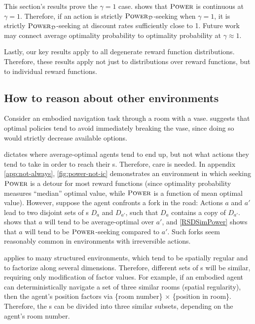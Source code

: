 This section's results prove the $\gamma=1$ case.  shows that $\text{\upshape\textsc{Power}}$ is continuous at  $\gamma=1$. Therefore, if an action is strictly $\text{\upshape\textsc{Power}}_{\mathcal{D}}$-seeking when $\gamma=1$, it is strictly $\text{\upshape\textsc{Power}}_{\mathcal{D}}$-seeking at discount rates sufficiently close to 1. Future work may connect average optimality probability to optimality probability at $\gamma\approx 1$. 

Lastly, our key results apply to all degenerate reward function distributions. Therefore, these results apply not just to distributions over reward functions, but to  individual reward functions.

\subsection{How to reason about other environments}
Consider an embodied navigation task through a room with a vase.  suggests that optimal policies tend to avoid immediately breaking the vase, since doing so would strictly decrease available options.

 dictates where average-optimal agents tend to end up, but not what actions they tend to take in order to reach their {\rsd}s. Therefore, care is needed. In appendix \ref{app:not-always}, \cref{fig:power-not-ic} demonstrates an environment in which seeking $\text{\upshape\textsc{Power}}$ is a detour for most reward functions (since optimality probability measures ``median'' optimal value, while $\text{\upshape\textsc{Power}}$ is a function of mean optimal value). However, suppose the agent confronts a fork in the road: Actions $a$ and $a'$ lead to two disjoint sets of {\rsd}s $D_{a}$ and $D_{a'}$, such that $D_a$ contains a copy of $D_{a'}$.  shows that $a$ will tend to be average-optimal over $a'$, and \cref{RSDSimPower} shows that $a$ will tend to be $\text{\upshape\textsc{Power}}$-seeking compared to $a'$. Such forks seem reasonably common in environments with irreversible actions.

 applies to many structured {\rl} environments, which tend to be spatially regular and to factorize along several dimensions. Therefore,  different sets of {\rsd}s will be similar, requiring only modification of factor values. For example, if an embodied agent can deterministically navigate a set of three similar rooms (spatial regularity), then the agent's position factors via \{room number\} $\times$ \{position in room\}. Therefore, the {\rsd}s can be divided into three similar subsets, depending on the agent’s room number.

